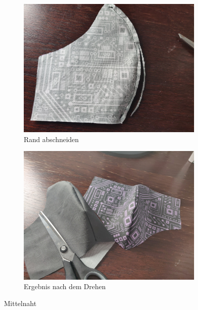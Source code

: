 \documentclass[12pt,parskip=full]{scrartcl}
\begin{document}
\begin{figure}[ht]
    \begin{subfigure}{0.48\textwidth}
        \centering
        \includegraphics[width = \linewidth]{Pictures/04_ButterflySeam/Butterfly_03_resized.jpg}
        \caption{Rand abschneiden}
        \label{Butterfly3}
    \end{subfigure}
    \begin{subfigure}{0.48\textwidth}
        \centering
        \includegraphics[width = \linewidth]{Pictures/04_ButterflySeam/Butterfly_04_resized.jpg}
        \caption{Ergebnis nach dem Drehen}
        \label{Butterfly4}
    \end{subfigure}
    \caption{Mittelnaht}
    \label{Butterfly}
\end{figure}
\end{document}
